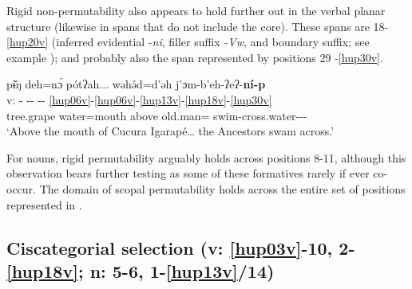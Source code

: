 \documentclass[output=paper]{langscibook}
\begin{document}
Rigid non-permutability also appears to hold further out in the verbal planar structure (likewise in spans that do not include the core). These spans are 18-\ref{hup20v} (inferred evidential -\textit{ni}, {filler} suffix \textit{{}-Vw}, and boundary suffix; see example ); and probably also the span represented by positions 29 -\ref{hup30v}.

\ea\label{ex:hup:key:20}
\glll pɨ̌ŋ deh=nɔ́ pótʔah... wǝhǝ́d=d'ǝh j'ɔm-b'eh-ʔeʔ-\textbf{ní-p} \\ 
v: - -{}- -{}- \ref{hup06v}-\ref{hup06v}-\ref{hup13v}-\ref{hup18v}-\ref{hup30v}\\ 
tree.grape  water=mouth   above old.man=\Pl{}  swim-cross.water-\Pfv{}-\Infr{}-\Dep{}\\ 
\glt `Above the mouth of Cucura Igarapé… the Ancestors swam across.'
\z 

For nouns, rigid permutability arguably holds across positions 8-11, although this observation bears further testing as some of these formatives rarely if ever co-occur. The domain of scopal permutability holds across the entire set of positions represented in .


\subsection{Ciscategorial selection (v: \ref{hup03v}-10, 2-\ref{hup18v}; n: 5-6, 1-\ref{hup13v}/14)} \label{sec:hup:key:4.3}
\end{document}
